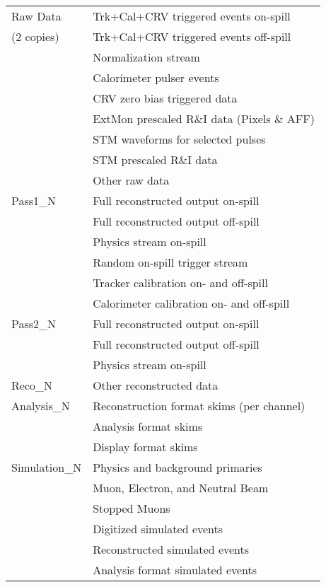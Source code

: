 \begin{table}[htb]
\centering
\begin{tabular}{|l|l|}\hline
Raw Data   & Trk+Cal+CRV triggered events on-spill \\
(2 copies) & Trk+Cal+CRV triggered events off-spill \\
           & Normalization stream \\
           & Calorimeter pulser events \\
           & CRV zero bias triggered data \\
           & ExtMon prescaled R\&I data (Pixels \& AFF) \\
           & STM waveforms for selected pulses \\
           & STM prescaled R\&I data \\ 
           & Other raw data \\ \hline
Pass1\_N    & Full reconstructed output on-spill\\
           & Full reconstructed output off-spill\\
           & Physics stream on-spill \\
           & Random on-spill trigger stream \\
           & Tracker calibration on- and off-spill\\
           & Calorimeter calibration on- and off-spill \\  \hline
Pass2\_N      & Full reconstructed output on-spill\\
           & Full reconstructed output off-spill\\
           & Physics stream on-spill \\ \hline
Reco\_N       & Other reconstructed data \\ \hline
Analysis\_N  & Reconstruction format skims (per channel)\\ 
           & Analysis format skims \\
           & Display format skims \\ \hline
Simulation\_N & Physics and background primaries\\
           & Muon, Electron, and Neutral Beam \\
           & Stopped Muons \\
           & Digitized simulated events \\
           & Reconstructed simulated events\\
           & Analysis format simulated events \\ \hline

\end{tabular}
\end{table}
